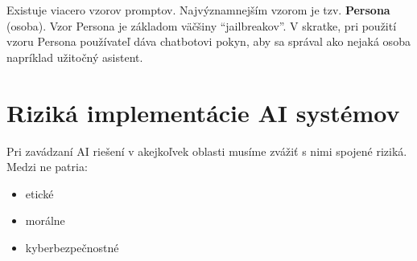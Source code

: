 Existuje viacero vzorov promptov. Najvýznamnejším vzorom je tzv. \textbf{Persona} (osoba). Vzor Persona je základom väčšiny ``jailbreakov''. V skratke, pri použití vzoru Persona používateľ dáva chatbotovi pokyn, aby sa správal ako nejaká osoba napríklad užitočný asistent.


\section*{Riziká implementácie AI systémov \label{sec:ai_risks_resume}}

Pri zavádzaní AI riešení v akejkoľvek oblasti musíme zvážiť s nimi spojené riziká. Medzi ne patria:

\begin{itemize}
    \item etické
    \item morálne
    \item kyberbezpečnostné
\end{itemize}





